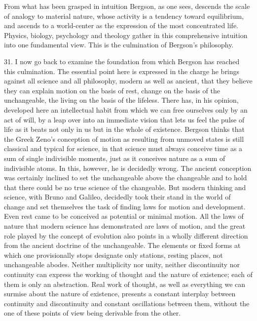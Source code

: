 \documentclass[12pt,a4paper,openany]{book}
\newcommand{\opage}[1]{\marginnote{\footnotesize\textit{[#1]}}}
\begin{document}
From what has been grasped in intuition Bergson, as one sees, descends the scale of analogy to material nature, whose activity is a tendency toward equilibrium, and ascends to a world-center as the expression of the most concentrated life. Physics, biology, psychology and theology gather in this comprehensive intuition into one fundamental view. This is the culmination of Bergson's philosophy.

31. I now go back to examine the foundation from which Bergson has reached this culmination. The essential point here is expressed in the charge he brings against all science and all philosophy, modern as well as ancient, that they believe they can explain motion on the basis of rest, change on the basis of the unchangeable, the living on the basis of the lifeless. There has, in his opinion, developed here an intellectual habit from which we can free ourselves only by an act of will, by a leap over into an immediate vision that lets us feel the pulse of life as it beats not only in us but in the whole of existence. Bergson thinks that the Greek Zeno's conception of motion as resulting from unmoved states is still classical and typical for science, in that science must always conceive time as a sum of single indivisible moments, just as it conceives nature as a sum of indivisible atoms.
\opage{57}In this, however, he is decidedly wrong. The ancient conception was certainly inclined to set the unchangeable above the changeable and to hold that there could be no true science of the changeable. But modern thinking and science, with Bruno and Galileo, decidedly took their stand in the world of change and set themselves the task of finding laws for motion and development. Even rest came to be conceived as potential or minimal motion. All the laws of nature that modern science has demonstrated are laws of motion, and the great role played by the concept of evolution also points in a wholly different direction from the ancient doctrine of the unchangeable. The elements or fixed forms at which one provisionally stops designate only stations, resting places, not unchangeable abodes. Neither multiplicity nor unity, neither discontinuity nor continuity can express the working of thought and the nature of existence; each of them is only an abstraction. Real work of thought, as well as everything we can surmise about the nature of existence, presents a constant interplay between continuity and discontinuity and constant oscillations between them, without the one of these points of view being derivable from the other.
\end{document}
